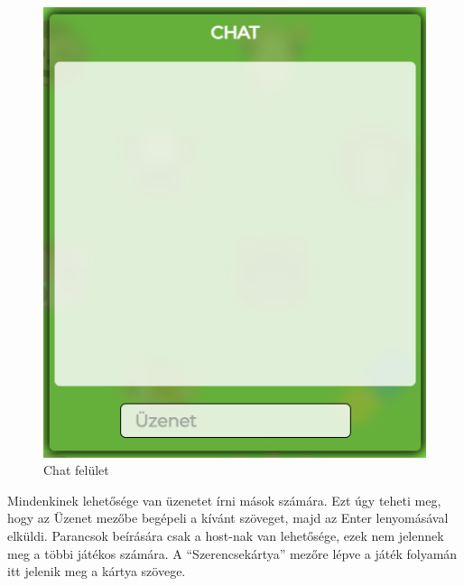 \begin{figure}[h!]
\centering
\includegraphics[scale=0.4]{images/50363fc646a02ca3f5dd4684b7066bac.png}
\caption{Chat felület}
\label{fig:ff}
\end{figure}

Mindenkinek lehetősége van üzenetet írni mások számára. Ezt úgy teheti meg, hogy az Üzenet mezőbe begépeli a kívánt szöveget, majd az Enter lenyomásával elküldi. Parancsok beírására csak a host-nak van lehetősége, ezek nem jelennek meg a többi játékos számára. A “Szerencsekártya” mezőre lépve a játék folyamán itt jelenik meg a kártya szövege.
\newpage
{}


